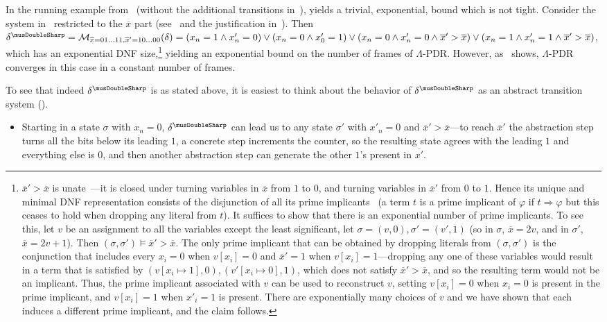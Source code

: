 \documentclass[acmsmall,screen]{acmart}
\newcommand{\ov}{\overline}
\renewcommand{\implies}{\Longrightarrow}
\newcommand{\tr}{\delta}
\renewcommand{\vec}{\ov}
\newcommand{\monox}[2]{\mathcal{M}_{#2}({#1})}
\newcommand{\absr}[1]{{#1}^{\musDoubleSharp}}
\begin{document}
\begin{example}
\label{ex:skip-counter-pure-exponential}
In the running example from~ (without the additional transitions in~),  yields a trivial, exponential, bound which is not tight.
Consider the system in~ restricted to the $\vec{x}$ part (see~ and the justification in~).
Then $\absr{\tr} = \monox{\tr}{\vec{x}=01\ldots11,\vec{x}'=10\ldots00} = (x_n=1 \land x'_n=0) \lor (x_n=0 \land x'_0=1) \lor (x_n=0 \land x'_n=0 \land \vec{x}' > \vec{x}) \lor (x_n=1 \land x'_n=1 \land \vec{x}' > \vec{x})$, which has an exponential DNF size,\footnote{
	 $\vec{x}' > \vec{x}$ is unate~\cite{DBLP:journals/jacm/AngluinHK93}---it is closed under turning variables in $\vec{x}$ from $1$ to $0$, and turning variables in $\vec{x}'$ from $0$ to $1$. Hence its unique and minimal DNF representation consists of the disjunction of all its prime implicants~\cite{quine1954two} (a term $t$ is a prime implicant of $\varphi$ if $t \implies \varphi$ but this ceases to hold when dropping any literal from $t$). It suffices to show that there is an exponential number of prime implicants.
	To see this, let $v$ be an assignment to all the variables except the least significant, let $\sigma=(v,0),\sigma'=(v',1)$ (so in $\sigma$, $\vec{x} = 2v$, and in $\sigma'$, $\vec{x} = 2v+1$). Then $(\sigma,\sigma') \models \vec{x}' > \vec{x}$.
	The only prime implicant that can be obtained by dropping literals from $(\sigma,\sigma')$ is the conjunction that includes every $x_i=0$ when $v[x_i]=0$ and $\vec{x}'=1$ when $v[x_i]=1$---dropping any one of these variables would result in a term that is satisfied by $(v[x_i \mapsto 1],0),(v'[x_i \mapsto 0],1)$, which does not satisfy $\vec{x}' > \vec{x}$, and so the resulting term would not be an implicant.
	Thus, the prime implicant associated with $v$ can be used to reconstruct $v$, setting $v[x_i]=0$ when $x_i=0$ is present in the prime implicant, and $v[x_i]=1$ when $x'_i=1$ is present. There are exponentially many choices of $v$ and we have shown that each induces a different prime implicant, and the claim follows.
}
yielding an exponential bound on the number of frames of $\Lambda$-PDR. However, as~ shows, $\Lambda$-PDR converges in this case in a constant number of frames.

To see that indeed $\absr{\tr}$ is as stated above, it is easiest to think about the behavior of $\absr{\tr}$ as an abstract transition system (). 
%
\begin{itemize}
	\item Starting in a state $\sigma$ with $x_n=0$, $\absr{\tr}$ can lead us to any state $\sigma'$ with $x'_n=0$ and $\vec{x}' > \vec{x}$---to reach $\vec{x}'$ the abstraction step turns all the bits below its leading $1$, a concrete step increments the counter, so the resulting state agrees with the leading $1$ and everything else is $0$, and then another abstraction step can generate the other $1$'s present in $\vec{x'}$.


\end{itemize}
\end{example}
\end{document}
